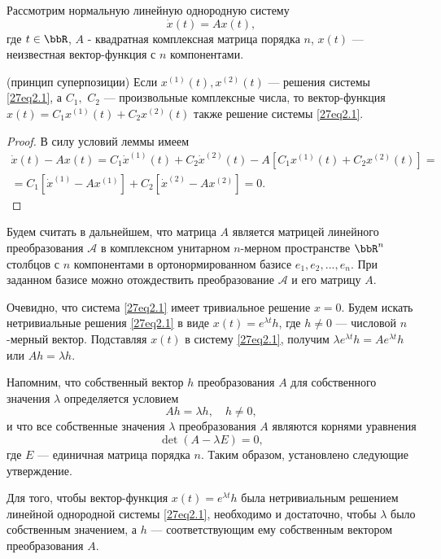 Рассмотрим нормальную линейную однородную систему
\begin{equation}\label{27eq2.1}
\dot x(t) = Ax(t),
\end{equation}
где $t\in\bbR$, $A$ - квадратная комплексная матрица порядка $n$, $x(t)$ --- неизвестная вектор-функция с $n$ компонентами.

\begin{lemm}\label{27lemm1} (принцип суперпозиции)
Если $x^{(1)}(t), x^{(2)}(t)$ --- решения системы \eqref{27eq2.1}, а  $C_1,$ $C_2$ --- произвольные комплексные числа, то вектор-функция $x(t)=C_1x^{(1)}(t)+C_2x^{(2)}(t)$ также решение системы \eqref{27eq2.1}.
\end{lemm}
\begin{proof}
В силу условий леммы имеем
\begin{multline*}
\dot x(t)-Ax(t)=C_1\dot x^{(1)}(t)+C_2\dot{x}^{(2)}(t)-A\left[C_1{x}^{(1)}(t)+C_2{x}^{(2)}(t)\right]=\\=C_1\left[\dot{x}^{(1)}-Ax^{(1)}\right]+C_2\left[\dot{x}^{(2)}-Ax^{(2)}\right]=0.\tag*{\qedhere}
\end{multline*}
\end{proof}
Будем считать в дальнейшем, что матрица $A$ является матрицей линейного преобразования $\mathcal A$ в комплексном унитарном $n$-мерном пространстве $\bbR^n$ столбцов с $n$ компонентами в ортонормированном базисе $e_1,e_2,...,e_n$. При заданном базисе можно отождествить преобразование $\mathcal A$ и его матрицу $A$.

Очевидно, что система \eqref{27eq2.1} имеет тривиальное решение $x=0$. Будем искать нетривиальные решения \eqref{27eq2.1} в виде $x(t)=e^{\lambda t}h$, где $h\neq 0$ --- числовой $n$-мерный вектор. Подставляя $x(t)$ в систему \eqref{27eq2.1}, получим $\lambda e^{\lambda t}h=Ae^{\lambda t}h$ или $Ah=\lambda h$.

Напомним, что собственный вектор $h$ преобразования $A$ для собственного значения $\lambda$ определяется условием
$$
Ah=\lambda h,\quad h\neq 0,
$$
и что все собственные значения $\lambda$ преобразования $A$ являются корнями уравнения
$$
\det(A-\lambda E)=0,
$$
где $E$ --- единичная матрица порядка $n$. Таким образом, установлено следующие утверждение.

\begin{lemm}\label{27lemm2}
Для того, чтобы вектор-функция $x(t)=e^{\lambda t}h$ была нетривиальным решением линейной однородной системы \eqref{27eq2.1}, необходимо и достаточно, чтобы $\lambda$ было собственным значением, а $h$ --- соответствующим ему собственным вектором преобразования $A$.
\end{lemm}

